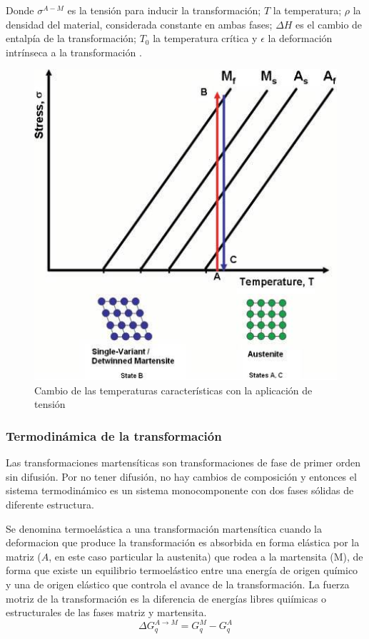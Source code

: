 \documentclass[12pt]{article}
\theoremstyle{definition}
\theoremstyle{remark}
\begin{document}
Donde $\sigma^{A-M}$ es la tensión para inducir la transformación; $T$ la temperatura; $\rho$ la densidad del material, considerada constante en ambas fases; $\Delta H$ es el cambio de entalpía de la transformación; $T_0$ la temperatura crítica y $\epsilon$ la deformación intrínseca a la transformación \citep{Malvasio}.

\begin{figure}[H]
	\centering
	\includegraphics[scale=0.4]{img/StressTransformation.png}
	\caption{Cambio de las temperaturas características con la aplicación de tensión}
	\label{TvsS}
\end{figure}

\subsubsection{Termodinámica de la transformación}
Las transformaciones martensíticas son transformaciones de fase de primer orden sin difusión. Por no tener difusión, no hay cambios de composición y entonces el sistema termodinámico es un sistema monocomponente con dos fases sólidas de diferente estructura.\cite{Santamarta}

Se denomina termoelástica a una transformación martensítica cuando la deformacion que produce la transformación es absorbida en forma elástica por la matriz ($A$, en este caso particular la austenita) que rodea a la martensita (M), de forma que existe un equilibrio termoelástico entre una energía de origen químico y una de origen elástico que controla el avance de la transformación. La fuerza motriz de la transformación es la diferencia de energías libres quiímicas o estructurales de las fases matriz y martensita.
\begin{equation}
	\Delta G^{A \rightarrow M}_q = G^M_q - G^A_q
\end{equation}
\end{document}
